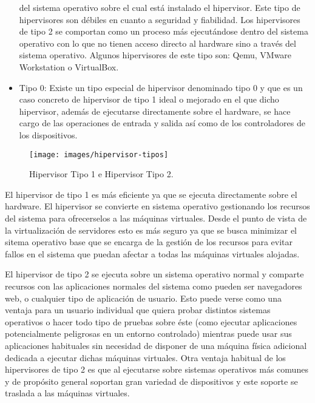 \documentclass[spanisheDIVcalc,twoside,parskip-,pointlessnumbers,final]{scrbook}
\begin{document}
\begin{itemize}
del sistema operativo sobre el cual está instalado el hipervisor.
Este tipo de hipervisores son débiles en cuanto a seguridad y fiabilidad.
Los hipervisores de tipo 2 se comportan como un proceso más ejecutándose
dentro del sistema operativo con lo que no tienen acceso directo al
hardware sino a través del sistema operativo. Algunos hipervisores
de este tipo son: Qemu, VMware Workstation o VirtualBox. 
\item Tipo 0: Existe un tipo especial de hipervisor denominado tipo 0 y
que es un caso concreto de hipervisor de tipo 1 ideal o mejorado en
el que dicho hipervisor, además de ejecutarse directamente sobre el
hardware, se hace cargo de las operaciones de entrada y salida así
como de los controladores de los dispositivos. 
\end{itemize}
\begin{figure}[htpb]
\begin{centering}
\texttt{[image: images/hipervisor-tipos]}
\par\end{centering}

\caption{Hipervisor Tipo 1 e Hipervisor Tipo 2.}
\label{hipervisor tipo 1 vs hipervisor tipo2}
\end{figure}


El hipervisor de tipo 1 es más eficiente ya que se ejecuta directamente
sobre el hardware. El hipervisor se convierte en sistema operativo
gestionando los recursos del sistema para ofrecerselos a las máquinas
virtuales. Desde el punto de vista de la virtualización de servidores
esto es más seguro ya que se busca minimizar el sitema operativo base
que se encarga de la gestión de los recursos para evitar fallos en
el sistema que puedan afectar a todas las máquinas virtuales alojadas. 

El hipervisor de tipo 2 se ejecuta sobre un sistema operativo normal
y comparte recursos con las aplicaciones normales del sistema como
pueden ser navegadores web, o cualquier tipo de aplicación de usuario.
Esto puede verse como una ventaja para un usuario individual que quiera
probar distintos sistemas operativos o hacer todo tipo de pruebas
sobre éste (como ejecutar aplicaciones potencialmente peligrosas en
un entorno controlado) mientras puede usar sus aplicaciones habituales
sin necesidad de disponer de una máquina física adicional dedicada
a ejecutar dichas máquinas virtuales. Otra ventaja habitual de los
hipervisores de tipo 2 es que al ejecutarse sobre sistemas operativos
más comunes y de propósito general soportan gran variedad de dispositivos
y este soporte se traslada a las máquinas virtuales.
\end{document}
